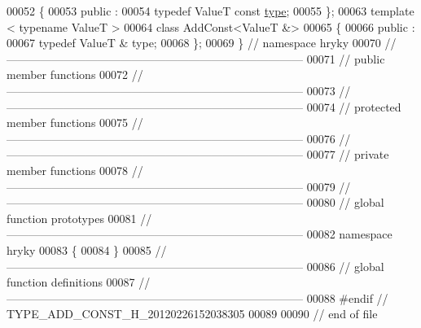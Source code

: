 \begin{DoxyCode}
00052 \{
00053 \textcolor{keyword}{public} :
00054     \textcolor{keyword}{typedef} ValueT \textcolor{keyword}{const}    \hyperlink{classhryky_1_1_add_const_adb29046fcfdac9d716cb5cb3c28d42ac}{type};
00055 \};
00063 \textcolor{keyword}{template} < \textcolor{keyword}{typename} ValueT >
00064 \textcolor{keyword}{class }AddConst<ValueT &>
00065 \{
00066 \textcolor{keyword}{public} :
00067     \textcolor{keyword}{typedef} ValueT &        type;
00068 \};
00069 \} \textcolor{comment}{// namespace hryky}
00070 \textcolor{comment}{//
      ------------------------------------------------------------------------------}
00071 \textcolor{comment}{// public member functions}
00072 \textcolor{comment}{//
      ------------------------------------------------------------------------------}
00073 \textcolor{comment}{//
      ------------------------------------------------------------------------------}
00074 \textcolor{comment}{// protected member functions}
00075 \textcolor{comment}{//
      ------------------------------------------------------------------------------}
00076 \textcolor{comment}{//
      ------------------------------------------------------------------------------}
00077 \textcolor{comment}{// private member functions}
00078 \textcolor{comment}{//
      ------------------------------------------------------------------------------}
00079 \textcolor{comment}{//
      ------------------------------------------------------------------------------}
00080 \textcolor{comment}{// global function prototypes}
00081 \textcolor{comment}{//
      ------------------------------------------------------------------------------}
00082 \textcolor{keyword}{namespace }hryky
00083 \{
00084 \} 
00085 \textcolor{comment}{//
      ------------------------------------------------------------------------------}
00086 \textcolor{comment}{// global function definitions}
00087 \textcolor{comment}{//
      ------------------------------------------------------------------------------}
00088 \textcolor{preprocessor}{#endif // TYPE\_ADD\_CONST\_H\_20120226152038305}
00089 \textcolor{preprocessor}{}
00090 \textcolor{comment}{// end of file}
\end{DoxyCode}
